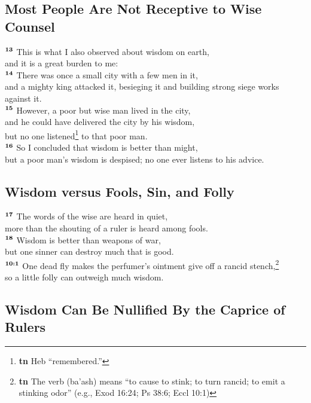 \documentclass[10pt,a4paper,final, onecolumn]{article}
\renewcommand{\textsuperscript}[1]{\ensuremath{^{\textbf{\scriptsize #1}}}}
\begin{document}
\subsection*{Most People Are Not Receptive to Wise Counsel}

    \textsuperscript{13} This is what I also observed about wisdom on earth, \\
    and it is a great burden to me: \\
    \textsuperscript{14} There was once a small city with a few men in it, \\
    and a mighty king attacked it, besieging it and building strong siege works against it. \\
    \textsuperscript{15} However, a poor but wise man lived in the city, \\
    and he could have delivered the city by his wisdom, \\
    but no one listened\footnote{\textbf{tn} Heb ``remembered.”} to that poor man. \\
    \textsuperscript{16} So I concluded that wisdom is better than might, \\
    but a poor man’s wisdom is despised; no one ever listens to his advice. \\


\subsection*{Wisdom versus Fools, Sin, and Folly}

    \textsuperscript{17} The words of the wise are heard in quiet, \\
    more than the shouting of a ruler is heard among fools. \\
    \textsuperscript{18} Wisdom is better than weapons of war, \\
    but one sinner can destroy much that is good. \\
    \textsuperscript{10:1} One dead fly makes the perfumer’s ointment give off a rancid stench,\footnote{\textbf{tn} The verb (ba’ash) means ``to cause to stink; to turn rancid; to emit a stinking odor” (e.g., Exod 16:24; Ps 38:6; Eccl 10:1)} \\
    so a little folly can outweigh much wisdom. \\


\subsection*{Wisdom Can Be Nullified By the Caprice of Rulers}
\end{document}
